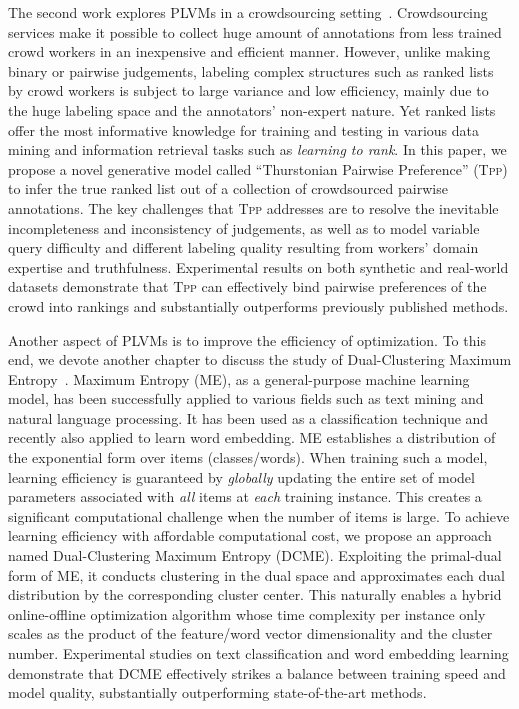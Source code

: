 The second work explores PLVMs in a crowdsourcing setting~\cite{wang2016tpp}.
Crowdsourcing services make it possible to collect huge amount of annotations
from less trained crowd workers in an inexpensive and efficient manner.
However, unlike making binary or pairwise judgements, labeling complex
structures such as ranked lists by crowd workers is subject to large variance
and low efficiency, mainly due to the huge labeling space and the annotators'
non-expert nature. Yet ranked lists offer the most informative knowledge for
training and testing in various data mining and information retrieval tasks such
as \textit{learning to rank}.  In this paper, we propose a novel generative
model called ``Thurstonian Pairwise Preference'' (\textsc{Tpp}) to infer the
true ranked list out of a collection of crowdsourced pairwise annotations.  The
key challenges that \textsc{Tpp} addresses are to resolve the inevitable
incompleteness and inconsistency of judgements, as well as to model variable
query difficulty and different labeling quality resulting from workers' domain
expertise and truthfulness.  Experimental results on both synthetic and
real-world datasets demonstrate that \textsc{Tpp} can effectively bind pairwise
preferences of the crowd into rankings and substantially outperforms previously
published methods.

Another aspect of PLVMs is to improve the efficiency of optimization. To this
end, we devote another chapter to discuss the study of Dual-Clustering Maximum
Entropy~\cite{wang2016dcme}.  Maximum Entropy (ME), as a general-purpose machine
learning model, has been successfully applied to various fields such as text
mining and natural language processing.  It has been used as a classification
technique and recently also applied to learn word embedding. ME establishes a
distribution of the exponential form over items (classes/words). When training
such a model, learning efficiency is guaranteed by \emph{globally} updating the
entire set of model parameters associated with \emph{all} items at \emph{each}
training instance. This creates a significant computational challenge when the
number of items is large. To achieve learning efficiency with affordable
computational cost, we propose an approach named Dual-Clustering Maximum Entropy
(DCME).  Exploiting the primal-dual form of ME, it conducts clustering in the
dual space and approximates each dual distribution by the corresponding cluster
center.  This naturally enables a hybrid online-offline optimization algorithm
whose time complexity per instance only scales as the product of the
feature/word vector dimensionality and the cluster number. Experimental studies
on text classification and word embedding learning demonstrate that DCME
effectively strikes a balance between training speed and model quality,
substantially outperforming state-of-the-art methods.

